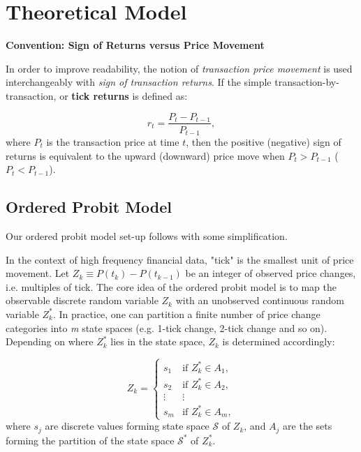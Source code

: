 \chapter{Theoretical Model}\label{chap:model}



{\noindent\bfseries Convention: Sign of Returns versus Price Movement}

In order to improve readability, the notion of \textit{transaction price movement} is used interchangeably with \textit{sign of transaction returns}. If the simple transaction-by-transaction, or \textbf{tick returns} is defined as:

\begin{equation}
    r_t = \frac{P_t - P_{t-1}}{P_{t-1}} ,
    \label{eq:1}
\end{equation}
where $P_t$ is the transaction price at time $t$, then the positive (negative) sign of returns is equivalent to the upward (downward) price move when \(P_t > P_{t-1}\) (\(P_t < P_{t-1}\)).

\section{Ordered Probit Model}

Our ordered probit model set-up follows \citet{hausman1992} with some simplification. 

In the context of high frequency financial data, "tick" is the smallest unit of price movement. Let $Z_k \equiv P(t_k) - P(t_{k-1})$ be an integer of observed price changes, i.e. multiples of tick. The core idea of the ordered probit model is to map the observable discrete random variable $Z_k$ with an unobserved continuous random variable $Z^*_k$. In practice, one can partition a finite number of price change categories into \textit{m} state spaces (e.g. 1-tick change, 2-tick change and so on). Depending on where $Z^*_k$ lies in the state space, $Z_k$ is determined accordingly:

\begin{equation}
Z_k =
\begin{cases}
s_1 & \text{if } Z_k^* \in A_1, \\
s_2 & \text{if } Z_k^* \in A_2, \\
\vdots & \vdots \\
s_m & \text{if } Z_k^* \in A_m,
\end{cases}
    \label{eq:2}
\end{equation}
where $s_j$ are discrete values forming state space \(\mathscr{S}\) of $Z_k$, and $A_j$ are the sets forming the partition of the state space \(\mathscr{S^*}\) of $Z^*_k$. 

